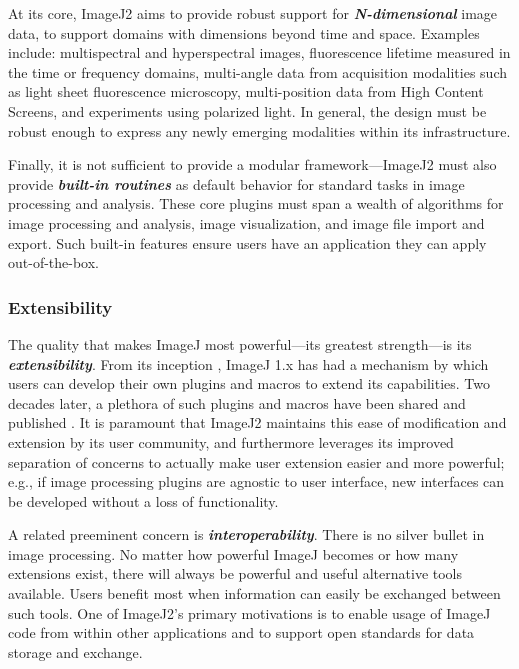 \documentclass{bmcart}
\begin{document}
At its core, ImageJ2 aims to provide robust support for
\textbf{\textit{N-dimensional}} image data, to support domains with dimensions
beyond time and space. Examples include: multispectral and hyperspectral
images, fluorescence lifetime measured in the time or frequency domains,
multi-angle data from acquisition modalities such as light sheet fluorescence
microscopy, multi-position data from High Content Screens, and experiments
using polarized light. In general, the design must be robust enough to express
any newly emerging modalities within its infrastructure.

Finally, it is not sufficient to provide a modular framework---ImageJ2 must
also provide \textbf{\textit{built-in routines}} as default behavior for
standard tasks in image processing and analysis. These core plugins must span a
wealth of algorithms for image processing and analysis, image visualization,
and image file import and export. Such built-in features ensure users have an
application they can apply out-of-the-box.

\subsubsection*{Extensibility}
The quality that makes ImageJ most powerful---its greatest strength---is its
\textbf{\textit{extensibility}}. From its inception \cite{imagej_history},
ImageJ 1.x has had a mechanism by which users can develop their own plugins and
macros to extend its capabilities. Two decades later, a plethora of such
plugins and macros have been shared and published \cite{imagej_ecosystem}. It
is paramount that ImageJ2 maintains this ease of modification and extension by
its user community, and furthermore leverages its improved separation of
concerns to actually make user extension easier and more powerful; e.g., if
image processing plugins are agnostic to user interface, new interfaces can be
developed without a loss of functionality.

A related preeminent concern is \textbf{\textit{interoperability}}. There is no
silver bullet in image processing. No matter how powerful ImageJ becomes or how
many extensions exist, there will always be powerful and useful alternative
tools available. Users benefit most when information can easily be exchanged
between such tools. One of ImageJ2's primary motivations is to enable usage of
ImageJ code from within other applications and to support open standards for
data storage and exchange.
\end{document}
